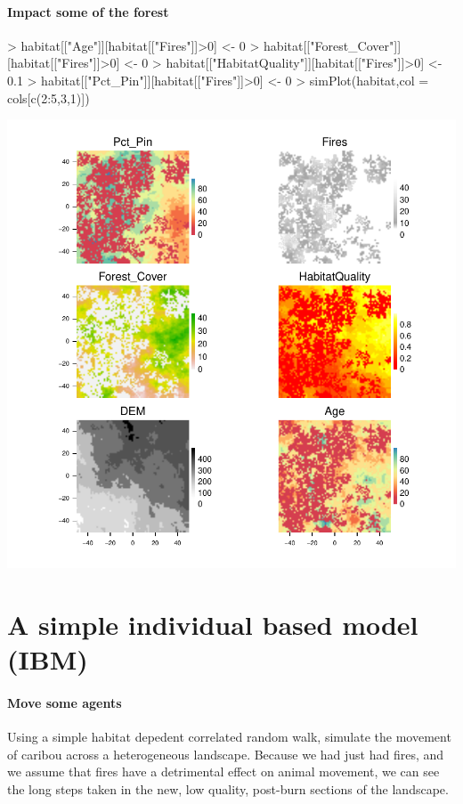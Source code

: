 \documentclass{article}
\begin{document}
\paragraph{Impact some of the forest}
\begin{Schunk}
\begin{Sinput}
> habitat[["Age"]][habitat[["Fires"]]>0] <- 0
> habitat[["Forest_Cover"]][habitat[["Fires"]]>0] <- 0
> habitat[["HabitatQuality"]][habitat[["Fires"]]>0] <- 0.1
> habitat[["Pct_Pin"]][habitat[["Fires"]]>0] <- 0
> simPlot(habitat,col = cols[c(2:5,3,1)])
\end{Sinput}
\end{Schunk}
\includegraphics{introduction-Fire-impacts-maps}

\section{A simple individual based model (IBM)}
\paragraph{Move some agents}
Using a simple habitat depedent correlated random walk, simulate the movement of caribou across a heterogeneous landscape. Because we had just had fires, and we assume that fires have a detrimental effect on animal movement, we can see the long steps taken in the new, low quality, post-burn sections of the landscape.
\end{document}
